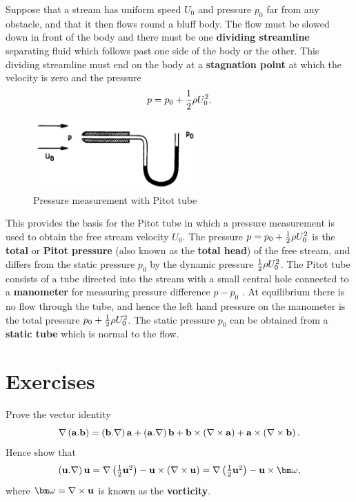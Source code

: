 \documentclass[10pt]{report}
\begin{document}
Suppose that a stream has uniform speed $U_{0}$ and pressure $p_{0}$ far
from any obstacle, and that it then flows round a bluff body. The flow must
be slowed down in front of the body and there must be one \textbf{dividing
streamline} separating fluid which follows past one side of the body or the
other. This dividing streamline must end on the body at a \textbf{stagnation
point} at which the velocity is zero and the pressure
\[
p=p_0 +{1 \over 2}\rho U_0^2 .
\]

\begin{figure}
\centerline{\includegraphics[width=2.5in]{Section33.pdf}}
\caption{ Pressure measurement with Pitot tube }
\label{fig3.3}
\end{figure}

This provides the basis for the Pitot tube in which a pressure measurement
is used to obtain the free stream velocity $U_{0}$. The pressure
$p=p_0 +\textstyle{1 \over 2}\rho U_0^2 $ is the
\textbf{total} or \textbf{Pitot pressure} (also known as the \textbf{total
head}) of the free stream, and differs from the static pressure $p_{0}$ by
the dynamic pressure $\textstyle{1 \over 2}\rho U_0^2 $. The Pitot tube
consists of a tube directed into the stream with a small central hole
connected to a \textbf{manometer} for measuring pressure difference $p -
p_{0}$ . At equilibrium there is no flow through the tube, and hence the
left hand pressure on the manometer is the total pressure $p_0
+\textstyle{1 \over 2}\rho U_0^2 $. The static pressure $p_{0}$ can
be obtained from a \textbf{static tube} which is normal to the flow.

\divider
\pagebreak

\section{Exercises}

\begin{questionstar}
	Prove the vector identity
	\[
	\nabla \left( {{{\bf a}}. {{\bf b}}} \right)=\left( {{{\bf
	b}}. \nabla } \right){{\bf a}}+\left( {{{\bf a}}. \nabla }
	\right){{\bf b}}+{{\bf b}}\times \left( {\nabla \times {{\bf
	a}}} \right)+{{\bf a}}\times \left( {\nabla \times {{\bf b}}}
	\right).
	\]
	Hence show that
	\[
		\left( {{{\bf u}}. \nabla } \right){{\bf u}}=\nabla \left(
		{\textstyle{\frac12}{{\bf u}}^2} \right)-{{\bf u}}\times \left(
		{\nabla \times {{\bf u}}} \right)=\nabla \left( {\textstyle{\frac12}{{\bf u}}^2} \right)-
		{{\bf u}}\times {\bm\omega},
	\]
	where $ {\bm\omega}=\nabla \times {{\bf u}}$ is known as the \textbf{vorticity}.
	\label{qn:identity1}
\end{questionstar}
\end{document}
